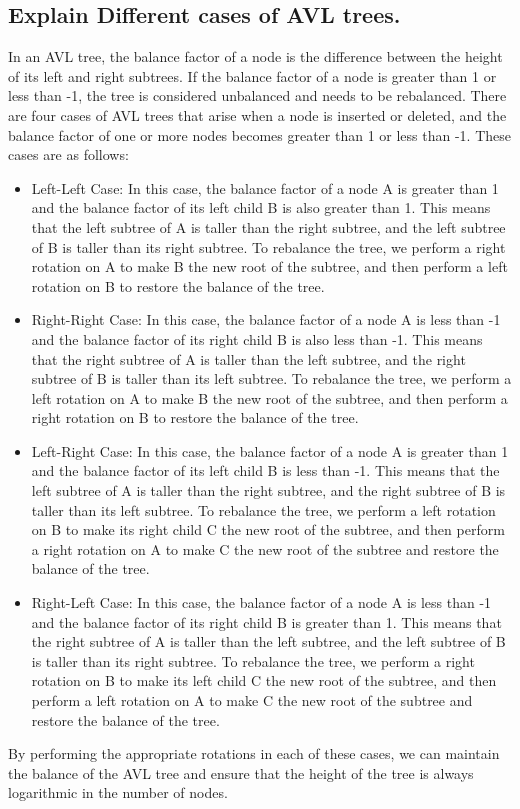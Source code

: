 \documentclass{article}
\begin{document}
\subsection{\textbf{Explain Different cases of AVL trees.}}
In an AVL tree, the balance factor of a node is the difference between the height of its left and right subtrees. If the balance factor of a node is greater than 1 or less than -1, the tree is considered unbalanced and needs to be rebalanced. There are four cases of AVL trees that arise when a node is inserted or deleted, and the balance factor of one or more nodes becomes greater than 1 or less than -1. These cases are as follows:
\begin{itemize}
    \item Left-Left Case: In this case, the balance factor of a node A is greater than 1 and the balance factor of its left child B is also greater than 1. This means that the left subtree of A is taller than the right subtree, and the left subtree of B is taller than its right subtree. To rebalance the tree, we perform a right rotation on A to make B the new root of the subtree, and then perform a left rotation on B to restore the balance of the tree.
    \item Right-Right Case: In this case, the balance factor of a node A is less than -1 and the balance factor of its right child B is also less than -1. This means that the right subtree of A is taller than the left subtree, and the right subtree of B is taller than its left subtree. To rebalance the tree, we perform a left rotation on A to make B the new root of the subtree, and then perform a right rotation on B to restore the balance of the tree.
    \item Left-Right Case: In this case, the balance factor of a node A is greater than 1 and the balance factor of its left child B is less than -1. This means that the left subtree of A is taller than the right subtree, and the right subtree of B is taller than its left subtree. To rebalance the tree, we perform a left rotation on B to make its right child C the new root of the subtree, and then perform a right rotation on A to make C the new root of the subtree and restore the balance of the tree.
    \item Right-Left Case: In this case, the balance factor of a node A is less than -1 and the balance factor of its right child B is greater than 1. This means that the right subtree of A is taller than the left subtree, and the left subtree of B is taller than its right subtree. To rebalance the tree, we perform a right rotation on B to make its left child C the new root of the subtree, and then perform a left rotation on A to make C the new root of the subtree and restore the balance of the tree.
\end{itemize}
By performing the appropriate rotations in each of these cases, we can maintain the balance of the AVL tree and ensure that the height of the tree is always logarithmic in the number of nodes.
\end{document}
